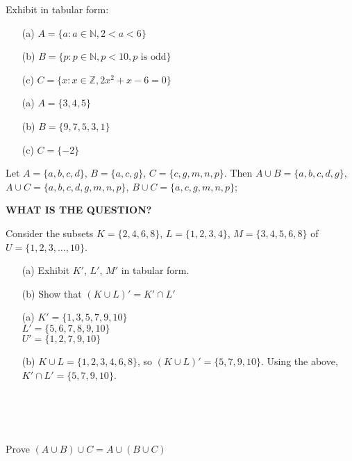\exercises

\exercise 
Exhibit in tabular form: 
\begin{itemize}
    \item[(a)] 
        $A = \{a : a \in \mathbb{N}, 2 < a < 6\}$
    \item[(b)] 
        $B = \{p : p \in \mathbb{N}, p < 10, p \text{ is odd}\}$
    \item[(c)] 
        $C = \{x : x \in \mathbb{Z}, 2x^2 + x - 6 = 0\}$
\end{itemize}

\answer
\begin{itemize}
    \item[(a)] 
        $A = \{3, 4, 5\}$
    \item[(b)] 
        $B = \{9, 7, 5, 3, 1\}$
    \item[(c)] 
        $C = \{-2\}$
\end{itemize}


\exercise 
Let $A = \{a,b,c,d\}$, $B = \{a,c,g\}$, $C = \{c,g,m,n,p\}$. Then $A \cup B = \{a,b,c,d,g\}$, $A \cup C = \{a,b,c,d,g,m,n,p\}$, $B \cup C = \{a,c,g,m,n,p\}$;

\answer 
\large\textbf{WHAT IS THE QUESTION?}\normalsize


\exercise 
Consider the subsets $K = \{2,4,6,8\}$, $L=\{1,2,3,4\}$, $M=\{3,4,5,6,8\}$ of $U = \{1,2,3,\ldots,10\}$.
\begin{itemize}
    \item[(a)]
        Exhibit $K'$, $L'$, $M'$ in tabular form.
    \item[(b)]
        Show that $(K \cup L)' = K' \cap L'$
\end{itemize}

\answer
\begin{itemize}
    \item[(a)]
        $K' = \{1,3,5,7,9,10\}$ \\
        $L' = \{5,6,7,8,9,10\}$ \\
        $U' = \{1,2,7,9,10\}$
    \item[(b)]
        $K \cup L = \{1,2,3,4,6,8\}$, so $(K \cup L)' = \{5,7,9,10\}$. Using the above, $K' \cap L' = \{5,7,9,10\}$.
\end{itemize}


\exercise \\
\exercise \\
\exercise \\
\exercise


\exercise 
Prove $(A \cup B) \cup C = A \cup (B \cup C)$

